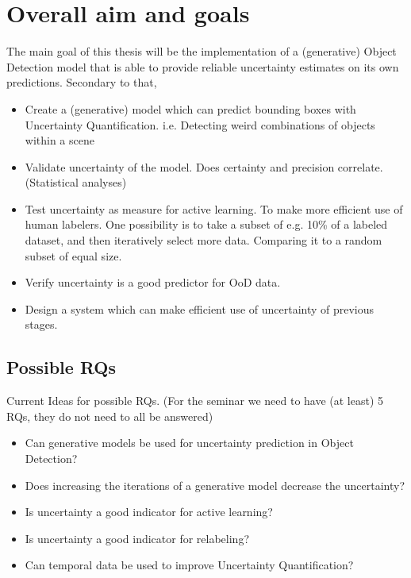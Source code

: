 \section{Overall aim and goals}\label{sec:goals}
The main goal of this thesis will be the implementation of a (generative) Object Detection model that is able to provide reliable uncertainty estimates on its own predictions. Secondary to that,
\begin{itemize}
    \item Create a (generative) model which can predict bounding boxes with Uncertainty Quantification.
          \subitem i.e. Detecting weird combinations of objects within a scene
    \item Validate uncertainty of the model.
          \subitem Does certainty and precision correlate. (Statistical analyses)
    \item Test uncertainty as measure for active learning.
          \subitem To make more efficient use of human labelers. One possibility is to take a subset of e.g. 10\% of a labeled dataset, and then iteratively select more data. Comparing it to a random subset of equal size.
    \item Verify uncertainty is a good predictor for OoD data.
    \item Design a system which can make efficient use of uncertainty of previous stages.
\end{itemize}


\subsection{Possible RQs}
Current Ideas for possible RQs. (For the seminar we need to have (at least) 5 RQs, they do not need to all be answered)

\begin{itemize}
    \item Can generative models be used for uncertainty prediction in Object Detection?
    \item Does increasing the iterations of a generative model decrease the uncertainty?
    \item Is uncertainty a good indicator for active learning?
    \item Is uncertainty a good indicator for relabeling?
    \item Can temporal data be used to improve Uncertainty Quantification?
\end{itemize}


